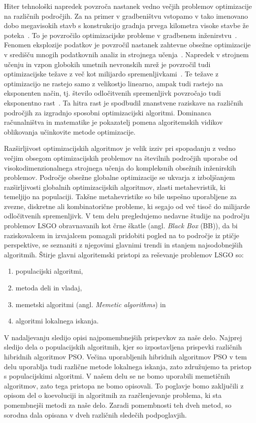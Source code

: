 Hiter tehnološki napredek povzroča nastanek vedno večjih problemov optimizacije na različnih področjih.
Za na primer v gradbeništvu vstopamo v tako imenovano dobo megavisokih stavb s konstrukcijo gradnja prvega kilometra visoke stavbe že poteka~\cite{bib:tallest_20}.
To je povzročilo optimizacijske probleme v gradbenem inženirstvu~\cite{bib:lsgo_engineering}.
Fenomen eksplozije podatkov je povzročil nastanek zahtevne obsežne optimizacije v središču mnogih podatkovnih analiz in strojnega učenja~\cite{bib:lsgo_machine_learning}.
Napredek v strojnem učenju in vzpon globokih umetnih nevronskih mrež je povzročil tudi optimizacijske težave z več kot milijardo spremenljivkami~\cite{bib:lsgo_deep_learning}.
Te težave z optimizacijo ne rastejo samo z velikostjo linearno, ampak tudi rastejo na eksponenten način, tj. število odločitvenih spremenljivk povzročajo tudi eksponentno rast~\cite{bib:lsgo_exponential_grouth}.
Ta hitra rast je spodbudil znanstvene raziskave na različnih področjih za izgradnjo sposobni optimizacijski algoritmi.
Dominanca računalništva in matematike je pokazatelj pomena algoritemskih vidikov oblikovanja učinkovite metode optimizacije.

Razširljivost optimizacijskih algoritmov je velik izziv pri spopadanju z vedno večjim obsegom optimizacijskih problemov na številnih področjih uporabe od visokodimenzionalnega strojnega učenja do kompleksnih obsežnih inženirskih problemov.
Področje obsežne globalne optimizacije se ukvarja z izboljšanjem razširljivosti globalnih optimizacijskih algoritmov, zlasti metahevristik, ki temeljijo na populaciji.
Takšne metahevristike so bile uspešno uporabljene za zvezne, diskretne ali kombinatorične probleme, ki segajo od več tisoč do milijarde odločitvenih spremenljivk.
V tem delu pregledujemo nedavne študije na področju problemov LSGO obravnavanih kot črne škatle (angl. \textit{Black Box} (BB)), da bi raziskovalcem in izvajalcem pomagali pridobiti pogled na to področje iz ptičje perspektive, se seznaniti z njegovimi glavnimi trendi in stanjem najsodobnejših algoritmih.
Štirje glavni algoritemski pristopi za reševanje problemov LSGO so:
\begin{enumerate}
	\item populacijski algoritmi,
	\item metoda deli in vladaj,
	\item memetski algoritmi (angl. \textit{Memetic algorithms}) in
	\item algoritmi lokalnega iskanja.
\end{enumerate}
V nadaljevanju sledijo opisi najpomembnejših prispevkov za naše delo.
Najprej sledijo dela o populacijskih algoritmih, kjer so izpostavljena prispevki različnih hibridnih algoritmov PSO.
Večina uporabljenih hibridnih algoritmov PSO v tem delu uporablja tudi različne metode lokalnega iskanja, zato združujemo ta pristop s populacijskimi algoritmi.
V našem delu se ne bomo uporabili memetičnih algoritmov, zato tega pristopa ne bomo opisovali.
To poglavje bomo zaključili z opisom del o koevoluciji in algoritmih za razčlenjevanje problema, ki sta pomembnejši metodi za naše delo.
Zaradi pomembnosti teh dveh metod, so sorodna dala opisana v dveh različnih sledečih podpoglavjih.


